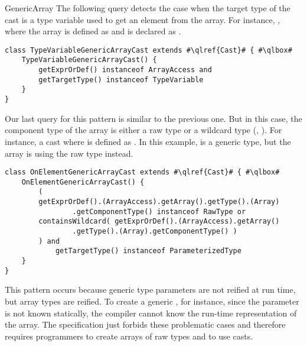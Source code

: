 \begin{pattern}{GenericArray}
The following query detects the case when the target type of the cast is a type variable used to get an element from the array.
For instance, ,
where the  array is defined as  and  is declared as .

\begin{listing}
\begin{verbatim}
class TypeVariableGenericArrayCast extends #\qlref{Cast}# { #\qlbox#
	TypeVariableGenericArrayCast() {
		getExprOrDef() instanceof ArrayAccess and
		getTargetType() instanceof TypeVariable
	}
}
\end{verbatim}
\end{listing}

Our last query for this pattern is similar to the previous one.
But in this case, the component type of the array is either a raw type or a wildcard type (\eg{}, ).
For instance, a cast  where  is defined as .
In this example,  is a generic type, but the array is using the raw type instead.

\begin{listing}
\begin{verbatim}
class OnElementGenericArrayCast extends #\qlref{Cast}# { #\qlbox#
	OnElementGenericArrayCast() {
		(
        getExprOrDef().(ArrayAccess).getArray().getType().(Array)
                .getComponentType() instanceof RawType or
        containsWildcard( getExprOrDef().(ArrayAccess).getArray()
                .getType().(Array).getComponentType() )
        ) and
            getTargetType() instanceof ParameterizedType
	}
}
\end{verbatim}
\end{listing}


\issues{}
This pattern occurs because generic type parameters are not reified at run time,
but array types are reified.
To create a generic , for instance,
since the parameter  is not known statically,
the compiler cannot know the run-time representation of the array.
The \java{} specification just forbids these problematic cases and therefore requires programmers to create arrays of raw types and to use casts.

\end{pattern}
